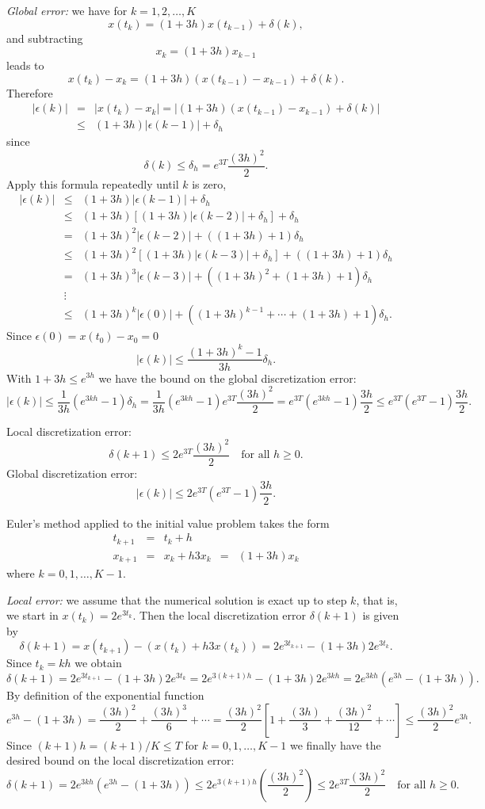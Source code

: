 {\em Global error:} we have for $k=1,2,\ldots,K$
\[
x(t_k)=(1+3h)x(t_{k-1})+\delta(k),
\]
and subtracting
\[
x_k = (1+3h)x_{k-1}
\]
leads to
\[
x(t_k) - x_k = (1+3h)(x(t_{k-1})-x_{k-1})+\delta(k).
\]
Therefore
\begin{eqnarray*}
|\epsilon(k)| & = & |x(t_k) - x_k| =
|(1+3h)(x(t_{k-1})-x_{k-1})+\delta(k)|\\
& \le & (1+3h)|\epsilon(k-1)|+\delta_h
\end{eqnarray*}
since
\[
\delta(k)\le \delta_h = e^{3T}\frac{(3h)^2}{2}.
\]
Apply this formula repeatedly until $k$ is zero,
\[
\begin{array}{rcl}
|\epsilon(k)|&\le&(1+3h)|\epsilon(k-1)|+\delta_h\\
&\le& (1+3h)[(1+3h)|\epsilon(k-2)|+\delta_h]+\delta_h\\
&=& (1+3h)^2|\epsilon(k-2)| + ((1+3h) + 1)\delta_h\\
&\le& (1+3h)^2[(1+3h)|\epsilon(k-3)|+\delta_h] + ((1+3h) + 1)\delta_h\\
&=& (1+3h)^3|\epsilon(k-3)| + ((1+3h)^2 + (1+3h) + 1)\delta_h\\
&\vdots& \\
&\le & (1+3h)^k|\epsilon(0)| + ((1+3h)^{k-1} +\cdots + (1+3h) + 1)\delta_h.
\end{array}
\]
Since $\epsilon(0)=x(t_0) - x_0=0$
\[
|\epsilon(k)| \le \frac{(1+3h)^k -1}{3h}\delta_h.
\]
With $1+3h\le e^{3h}$ we have the bound on the global discretization error:
\[
|\epsilon(k)| \le \frac{1}{3h} (e^{3kh}-1)\delta_h=
\frac{1}{3h}(e^{3kh}-1)e^{3T}\frac{(3h)^2}{2} =
e^{3T}(e^{3kh}-1)\frac{3h}{2}
\le e^{3T}(e^{3T}-1)\frac{3h}{2}.
\]

 \ans Local discretization error:
\[
\delta(k+1) \le
2e^{3T}\frac{(3h)^2}{2} \quad \mbox{for all $h\ge 0$.}
\]
Global discretization error:
\[
|\epsilon(k)| \le 2e^{3T}(e^{3T}-1)\frac{3h}{2}.
\]

\soln Euler's method applied to the initial value problem takes the form
\[
\begin{array}{rclcl}
t_{k+1} & = & t_k+h & & \\
x_{k+1} & = & x_k + h 3x_k & = & (1+3h)x_k
\end{array}
\]
where $k=0,1,\ldots,K-1$.

{\em Local error:} we assume that the
numerical solution is exact up to step $k$, that is,
we start in $x(t_k)=2e^{3t_k}$.  Then the local discretization error
$\delta(k+1)$ is given by
\[
\delta(k+1) = x(t_{k+1}) - (x(t_k) + h 3 x(t_k))=
2e^{3t_{k+1}} - (1+3h)2e^{3t_k}.
\]
Since $t_k = kh$ we obtain
\[
\delta(k+1) = 2e^{3t_{k+1}} - (1+3h)2e^{3t_k} =
2e^{3(k+1)h} - (1+3h)2e^{3kh} = 2e^{3kh}(e^{3h}-(1+3h)).
\]
By definition of the exponential function
\[
e^{3h}-(1+3h) = \frac{(3h)^2}{2}+\frac{(3h)^3}{6}+\cdots =
\frac{(3h)^2}{2}\left[ 1+\frac{(3h)}{3}+\frac{(3h)^2}{12}+\cdots\right]
\le \frac{(3h)^2}{2}e^{3h}.
\]
Since $(k+1)h=(k+1)/K\le T$ for $k=0,1,\ldots,K-1$ we finally have the
desired bound on the local discretization error:
\[
\delta(k+1) = 2e^{3kh}(e^{3h}-(1+3h)) \le
2e^{3(k+1)h}\left(\frac{(3h)^2}{2}\right)\le
2e^{3T}\frac{(3h)^2}{2} \quad \mbox{for all $h\ge 0$.}
\]

